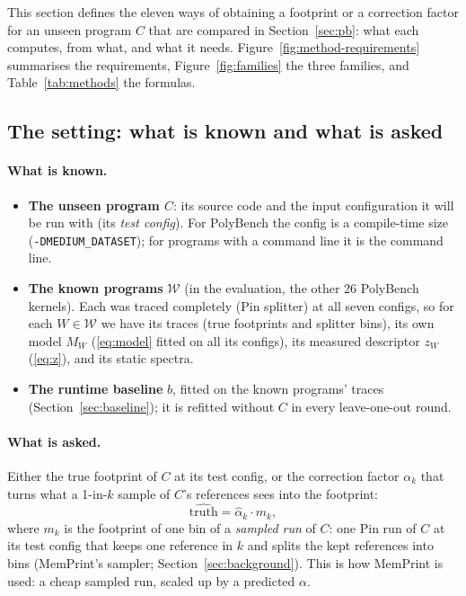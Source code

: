 \documentclass[11pt]{article}
\newcommand{\memprint}{MemPrint}
\newcommand{\term}[1]{\emph{#1}}
\newcommand{\code}[1]{\texttt{#1}}
\newcommand{\secref}[1]{Section~\ref{#1}}
\newcommand{\figref}[1]{Figure~\ref{#1}}
\newcommand{\tabref}[1]{Table~\ref{#1}}
\begin{document}
This section defines the eleven ways of obtaining a footprint or a correction factor for an unseen program $C$ that
are compared in \secref{sec:pb}: what each computes, from what, and what it needs. \figref{fig:method-requirements}
summarises the requirements, \figref{fig:families} the three families, and \tabref{tab:methods} the formulas.

\subsection{The setting: what is known and what is asked}
\label{sec:setting}

\paragraph{What is known.}
\begin{itemize}
\item \textbf{The unseen program $C$}: its source code and the input configuration it will be run with (its
\term{test config}). For PolyBench the config is a compile-time size (\code{-DMEDIUM\_DATASET}); for programs with a
command line it is the command line.
\item \textbf{The known programs} $\mathcal{W}$ (in the evaluation, the other 26 PolyBench kernels). Each was traced
completely (Pin splitter) at all seven configs, so for each $W \in \mathcal{W}$ we have its traces (true footprints and
splitter bins), its own model $M_W$ (\eqref{eq:model} fitted on all its configs), its measured descriptor $z_W$
(\eqref{eq:z}), and its static spectra.
\item \textbf{The runtime baseline} $b$, fitted on the known programs' traces (\secref{sec:baseline}); it is refitted
without $C$ in every leave-one-out round.
\end{itemize}

\paragraph{What is asked.} Either the true footprint of $C$ at its test config, or the correction factor $\alpha_k$
that turns what a 1-in-$k$ sample of $C$'s references sees into the footprint:
\begin{equation}
\widehat{\text{truth}} = \hat\alpha_k \cdot m_k ,
\label{eq:apply}
\end{equation}
where $m_k$ is the footprint of one bin of a \term{sampled run} of $C$: one Pin run of $C$ at its test config that
keeps one reference in $k$ and splits the kept references into bins (\memprint{}'s sampler; \secref{sec:background}).
This is how \memprint{} is used: a cheap sampled run, scaled up by a predicted $\alpha$.
\end{document}
